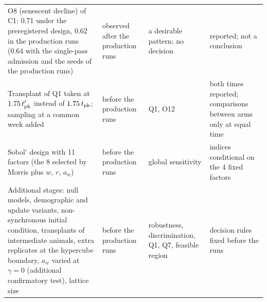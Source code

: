 \begin{table}[ht]
\begin{tabular}{@{}p{4.9cm}p{2.6cm}p{4.3cm}p{3.7cm}@{}}
O8 (senescent decline) of \textsf{C1}: 0.71 under the preregistered design, 0.62 in the production runs (0.64 with the
single-pass admission and the seeds of the production runs) & observed after the production runs & a desirable pattern; no
decision & reported; not a conclusion \\
Transplant of Q1 taken at $1.75\,t'_{\rm pk}$ instead of $1.75\,t_{\rm pk}$; sampling at a common week added &
before the production runs & Q1, O12 & both times reported; comparisons between arms only at equal time \\
Sobol' design with 11 factors (the 8 selected by Morris plus $w$, $r$, $a_w$) & before the production runs & global
sensitivity & indices conditional on the 4 fixed factors \\
Additional stages: null models, demographic and update variants, non-synchronous initial condition, transplants of
intermediate animals, extra replicates at the hypercube boundary, $a_w$ varied at $\gamma=0$ (additional confirmatory test), lattice size & before the production runs & robustness, discrimination, Q1, Q7, feasible region & decision rules fixed before the runs \\
\bottomrule
\end{tabular}
\end{table}

